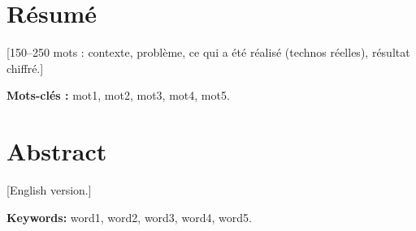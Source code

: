 \chapter*{Résumé}
[150--250 mots : contexte, problème, ce qui a été réalisé (technos réelles), résultat chiffré.]

\medskip\noindent\textbf{Mots-clés :} mot1, mot2, mot3, mot4, mot5.

\chapter*{Abstract}
[English version.]

\medskip\noindent\textbf{Keywords:} word1, word2, word3, word4, word5.
